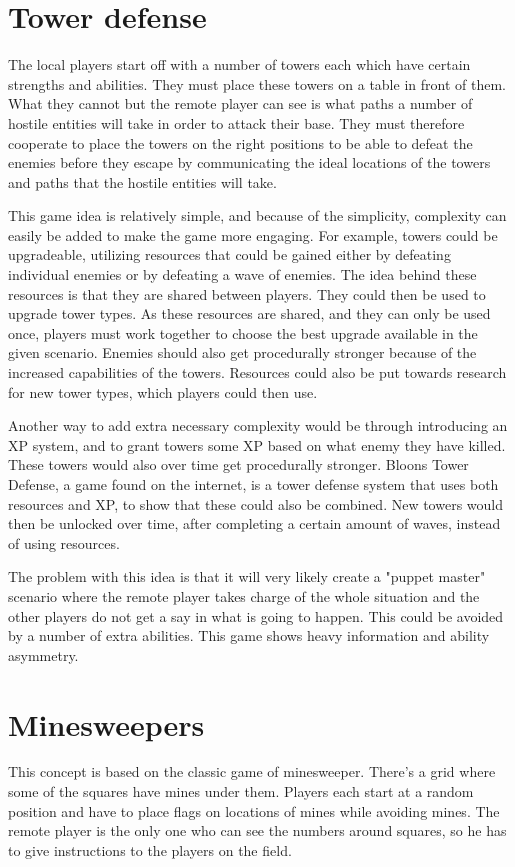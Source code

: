 \section{Tower defense}
	The local players start off with a number of towers each
	which have certain strengths and abilities. They must place
	these towers on a table in front of them. What they cannot
	but the remote player can see is what paths a number of
	hostile entities will take in order to attack their base.
	They must therefore cooperate to place the towers on the right
	positions to be able to defeat the enemies before they escape
	by communicating the ideal locations of the
	towers and paths that the hostile entities will take.
	
	This game idea is relatively simple, and because of the simplicity,
	complexity can easily be added to make the game more engaging. For
	example, towers could be upgradeable, utilizing resources that
	could be gained either by defeating individual enemies or by defeating
	a wave of enemies. The idea behind these resources is that they are 
	shared between players. They could then be used to upgrade
	tower types. As these resources are shared, and they can only be
	used once, players must work together to choose the best upgrade
	available in the given scenario. Enemies should also get procedurally
	stronger because of the increased capabilities of the towers. Resources
	could also be put towards research for new tower types, which players 
	could then use.
	
	Another way to add extra necessary complexity would be through
	introducing an XP system, and to grant towers some XP based on what enemy
	they have killed. These towers would also over time get procedurally
	stronger. Bloons Tower Defense, a game found on the internet, is a tower
	defense system that uses both resources and XP, to show that these could
	also be combined.  New towers would then be unlocked over time, after
	completing a certain amount of waves, instead of using resources.

	The problem with this idea is that it will very likely create a
	"puppet master" scenario where the remote player takes charge
	of the whole situation and the other players do not get a
	say in what is going to happen. This could be avoided by a
	number of extra abilities. This game shows heavy
	information and ability asymmetry.

\section{Minesweepers}
	This concept is based on the classic game of minesweeper. There's a grid
	where some of the squares have mines under them. Players each start at a
	random position and have to place flags on locations of mines while avoiding
	mines. The remote player is the only one who can see the numbers around
	squares, so he has to give instructions to the players on the field.

